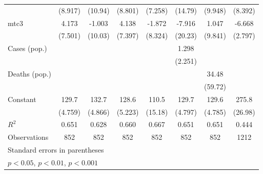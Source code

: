 \documentclass{article}
\begin{document}
{\begin{longtable}{l*{7}{c}}
                &  (8.917)         &  (10.94)         &  (8.801)         &  (7.258)         &  (14.79)         &  (9.948)         &  (8.392)         \\
mtc3            &    4.173         &   -1.003         &    4.138         &   -1.872         &   -7.916         &    1.047         &   -6.668         \\
                &  (7.501)         &  (10.03)         &  (7.397)         &  (8.324)         &  (20.23)         &  (9.841)         &  (2.797)         \\
Cases (pop.)    &                  &                  &                  &                  &    1.298         &                  &                  \\
                &                  &                  &                  &                  &  (2.251)         &                  &                  \\
Deaths (pop.)   &                  &                  &                  &                  &                  &    34.48         &                  \\
                &                  &                  &                  &                  &                  &  (59.72)         &                  \\
Constant        &    129.7\sym{***}&    132.7\sym{***}&    128.6\sym{***}&    110.5\sym{***}&    129.7\sym{***}&    129.6\sym{***}&    275.8\sym{***}\\
                &  (4.759)         &  (4.866)         &  (5.223)         &  (15.18)         &  (4.797)         &  (4.785)         &  (26.98)         \\
\hline
\(R^{2}\)       &    0.651         &    0.628         &    0.660         &    0.667         &    0.651         &    0.651         &    0.444         \\
Observations    &      852         &      852         &      852         &      852         &      852         &      852         &     1212         \\
\hline\hline
\multicolumn{8}{l}{\footnotesize Standard errors in parentheses}\\
\multicolumn{8}{l}{\footnotesize \sym{*} \(p<0.05\), \sym{**} \(p<0.01\), \sym{***} \(p<0.001\)}\\
\end{longtable}
}
\end{document}
